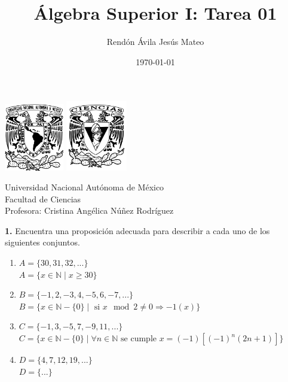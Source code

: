 \documentclass[12pt]{article}
\title{\textbf{Álgebra Superior I: Tarea 01}}
\author{Rendón Ávila Jesús Mateo}
\date{\today}
\begin{document}
\maketitle
\begin{center}
\vspace{3cm}
\includegraphics[width=0.195\textwidth]{Escudo.png}
\hspace{0.5cm}
\includegraphics[width=0.2\textwidth]{logo_ciencias.png}
\end{center}
\begin{center}
    \vspace{1cm}
    Universidad Nacional Autónoma de México\\
    Facultad de Ciencias\\
    Profesora: Cristina Angélica Núñez Rodríguez\\
\end{center}

\newpage

%
%
\textbf{1.} Encuentra una proposición adecuada para describir a cada uno de los siguientes conjuntos.
\begin{enumerate}[label=\alph*)]
    \item $A = \{30, 31, 32, ...\}$\\
    $A = \{x \in \mathbb{N} \mid x \geq 30\}$
    \item $B = \{-1, 2, -3, 4, -5, 6, -7, ...\}$\\
    $B = \{x \in \mathbb{N}-\{0\} \mid \text{ si } x \mod 2 \neq 0 \Rightarrow -1(x)\}$
    \item $C = \{-1, 3, -5, 7, -9, 11, ...\}$\\
    $C = \{x \in \mathbb{N} - \{0\} \mid \forall n \in \mathbb{N} \text{ se cumple } x = (-1) [(-1)^n (2n + 1)] \}$
    \item $D = \{4, 7, 12, 19, ...\}$\\
    $D = \{...\}$
\end{enumerate}
\end{document}
